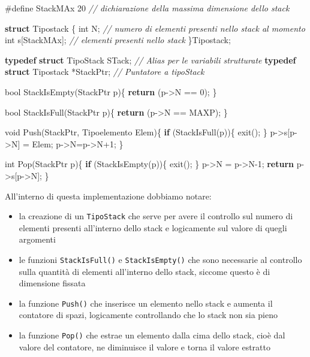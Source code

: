 \documentclass[
]{article}
\newenvironment{Shaded}{}{}
\newcommand{\CommentTok}[1]{\textcolor[rgb]{0.38,0.63,0.69}{\textit{#1}}}
\newcommand{\ControlFlowTok}[1]{\textcolor[rgb]{0.00,0.44,0.13}{\textbf{#1}}}
\newcommand{\DataTypeTok}[1]{\textcolor[rgb]{0.56,0.13,0.00}{#1}}
\newcommand{\DecValTok}[1]{\textcolor[rgb]{0.25,0.63,0.44}{#1}}
\newcommand{\KeywordTok}[1]{\textcolor[rgb]{0.00,0.44,0.13}{\textbf{#1}}}
\newcommand{\NormalTok}[1]{#1}
\newcommand{\PreprocessorTok}[1]{\textcolor[rgb]{0.74,0.48,0.00}{#1}}
\begin{document}
\begin{Shaded}
\begin{Highlighting}[]
\PreprocessorTok{\#define StackMAx 20 }\CommentTok{// dichiarazione della massima dimensione dello stack}

\KeywordTok{struct}\NormalTok{ Tipostack \{}
    \DataTypeTok{int}\NormalTok{ N; 			 }\CommentTok{// numero di elementi presenti nello stack al momento}
    \DataTypeTok{int}\NormalTok{ s[StackMAx]; }\CommentTok{// elementi presenti nello stack}
\NormalTok{\}Tipostack;}

\KeywordTok{typedef} \KeywordTok{struct}\NormalTok{ TipoStack STack; 	}\CommentTok{// Alias per le variabili strutturate}
\KeywordTok{typedef} \KeywordTok{struct}\NormalTok{ Tipostack *StackPtr; }\CommentTok{// Puntatore a tipoStack}

\DataTypeTok{bool}\NormalTok{ StackIsEmpty(StackPtr p)\{}
    \ControlFlowTok{return}\NormalTok{ (p{-}\textgreater{}N == }\DecValTok{0}\NormalTok{);}
\NormalTok{\}}

\DataTypeTok{bool}\NormalTok{ StackIsFull(StackPtr p)\{}
    \ControlFlowTok{return}\NormalTok{ (p{-}\textgreater{}N == MAXP);}
\NormalTok{\}}

\DataTypeTok{void}\NormalTok{ Push(StackPtr, Tipoelemento Elem)\{}
    \ControlFlowTok{if}\NormalTok{ (StackIsFull(p))\{}
\NormalTok{        exit();}
\NormalTok{    \}}
\NormalTok{    p{-}\textgreater{}s[p{-}\textgreater{}N] = Elem;}
\NormalTok{    p{-}\textgreater{}N=p{-}\textgreater{}N+}\DecValTok{1}\NormalTok{;}
\NormalTok{\}}

\DataTypeTok{int}\NormalTok{ Pop(StackPtr p)\{}
    \ControlFlowTok{if}\NormalTok{ (StackIsEmpty(p))\{}
\NormalTok{        exit();}
\NormalTok{    \}}
\NormalTok{    p{-}\textgreater{}N = p{-}\textgreater{}N{-}}\DecValTok{1}\NormalTok{;}
    \ControlFlowTok{return}\NormalTok{ p{-}\textgreater{}s[p{-}\textgreater{}N];}
\NormalTok{\}}
\end{Highlighting}
\end{Shaded}

All'interno di questa implementazione dobbiamo notare:

\begin{itemize}
\item
  la creazione di un \texttt{TipoStack} che serve per avere il controllo
  sul numero di elementi presenti all'interno dello stack e logicamente
  sul valore di quegli argomenti
\item
  le funzioni \texttt{StackIsFull()} e \texttt{StackIsEmpty()} che sono
  necessarie al controllo sulla quantità di elementi all'interno dello
  stack, siccome questo è di dimensione fissata
\item
  la funzione \texttt{Push()} che inserisce un elemento nello stack e
  aumenta il contatore di spazi, logicamente controllando che lo stack
  non sia pieno
\item
  la funzione \texttt{Pop()} che estrae un elemento dalla cima dello
  stack, cioè dal valore del contatore, ne diminuisce il valore e torna
  il valore estratto
\end{itemize}
\end{document}
